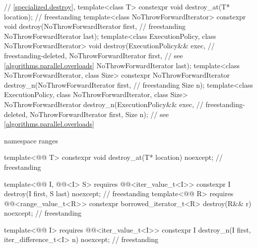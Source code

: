 \begin{codeblock}
{  // \ref{specialized.destroy}, 
  template<class T>
    constexpr void destroy_at(T* location);                                         // freestanding
  template<class NoThrowForwardIterator>
    constexpr void destroy(NoThrowForwardIterator first,                            // freestanding
                           NoThrowForwardIterator last);
  template<class ExecutionPolicy, class NoThrowForwardIterator>
    void destroy(ExecutionPolicy&& exec,                                    // freestanding-deleted,
                 NoThrowForwardIterator first,                              // see \ref{algorithms.parallel.overloads}
                 NoThrowForwardIterator last);
  template<class NoThrowForwardIterator, class Size>
    constexpr NoThrowForwardIterator destroy_n(NoThrowForwardIterator first,        // freestanding
                                               Size n);
  template<class ExecutionPolicy, class NoThrowForwardIterator, class Size>
    NoThrowForwardIterator destroy_n(ExecutionPolicy&& exec,                // freestanding-deleted,
                                     NoThrowForwardIterator first, Size n); // see \ref{algorithms.parallel.overloads}

  namespace ranges {
    template<@@ T>
      constexpr void destroy_at(T* location) noexcept;                              // freestanding

    template<@@ I, @@<I> S>
      requires @@<iter_value_t<I>>
        constexpr I destroy(I first, S last) noexcept;                              // freestanding
    template<@@ R>
      requires @@<range_value_t<R>>
        constexpr borrowed_iterator_t<R> destroy(R&& r) noexcept;                   // freestanding

    template<@@ I>
      requires @@<iter_value_t<I>>
        constexpr I destroy_n(I first, iter_difference_t<I> n) noexcept;            // freestanding

}}
\end{codeblock}
